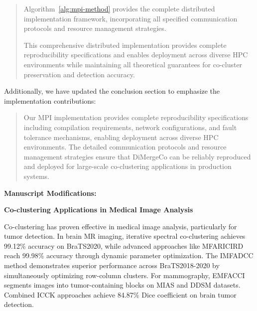 \documentclass{ar2rc}
\begin{document}
\begin{quote}
Algorithm~\ref{alg:mpi-method} provides the complete distributed implementation framework, incorporating all specified communication protocols and resource management strategies.

This comprehensive distributed implementation provides complete reproducibility specifications and enables deployment across diverse HPC environments while maintaining all theoretical guarantees for co-cluster preservation and detection accuracy.
\end{quote}

Additionally, we have updated the conclusion section to emphasize the implementation contributions:

\begin{quote}
Our MPI implementation provides complete reproducibility specifications including compilation requirements, network configurations, and fault tolerance mechanisms, enabling deployment across diverse HPC environments. The detailed communication protocols and resource management strategies ensure that DiMergeCo can be reliably reproduced and deployed for large-scale co-clustering applications in production systems.
\end{quote}



\textbf{Manuscript Modifications:}

\textbf{Co-clustering Applications in Medical Image Analysis}

Co-clustering has proven effective in medical image analysis, particularly for tumor detection. In brain MR imaging, iterative spectral co-clustering achieves 99.12\% accuracy on BraTS2020\cite{farnoosh2024DevelopmentUnsupervisedPseudodeep}, while advanced approaches like MFARICIRD reach 99.98\% accuracy through dynamic parameter optimization\cite{farnoosh2025PseudodeepUnsupervisedModelbased}. The IMFADCC method demonstrates superior performance across BraTS2018-2020 by simultaneously optimizing row-column clusters\cite{farnoosh2024BrainMagneticResonance}. For mammography, EMFACCI segments images into tumor-containing blocks on MIAS and DDSM datasets\cite{farnoosh2024NovelApproachAutomatic}. Combined ICCK approaches achieve 84.87\% Dice coefficient on brain tumor detection\cite{farnoosh2022ApplicationModifiedCombinational}.
\end{document}
